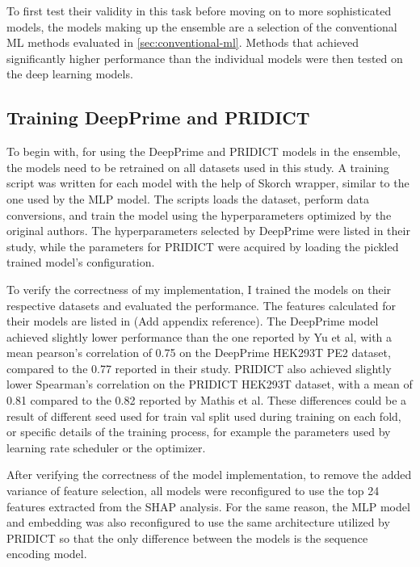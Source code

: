 To first test their validity in this task before moving on to more sophisticated models, the models making up the ensemble are a selection of the conventional ML methods evaluated in \autoref{sec:conventional-ml}. Methods that achieved significantly higher performance than the individual models were then tested on the deep learning models.


\subsection{Training DeepPrime and PRIDICT}
\label{sec:training-deepprime-pridict}

To begin with, for using the DeepPrime and PRIDICT models in the ensemble, the models need to be retrained on all datasets used in this study. A training script was written for each model with the help of Skorch wrapper, similar to the one used by the MLP model. The scripts loads the dataset, perform data conversions, and train the model using the hyperparameters optimized by the original authors. The hyperparameters selected by DeepPrime were listed in their study, while the parameters for PRIDICT were acquired by loading the pickled trained model's configuration. 

To verify the correctness of my implementation, I trained the models on their respective datasets and evaluated the performance. The features calculated for their models are listed in (Add appendix reference). The DeepPrime model achieved slightly lower performance than the one reported by Yu et al, with a mean pearson's correlation of 0.75 on the DeepPrime HEK293T PE2 dataset, compared to the 0.77 reported in their study. PRIDICT also achieved slightly lower Spearman's correlation on the PRIDICT HEK293T dataset, with a mean of 0.81 compared to the 0.82 reported by Mathis et al. These differences could be a result of different seed used for train val split used during training on each fold, or specific details of the training process, for example the parameters used by learning rate scheduler or the optimizer. 

After verifying the correctness of the model implementation, to remove the added variance of feature selection, all models were reconfigured to use the top 24 features extracted from the SHAP analysis. For the same reason, the MLP model and embedding was also reconfigured to use the same architecture utilized by PRIDICT so that the only difference between the models is the sequence encoding model. 

